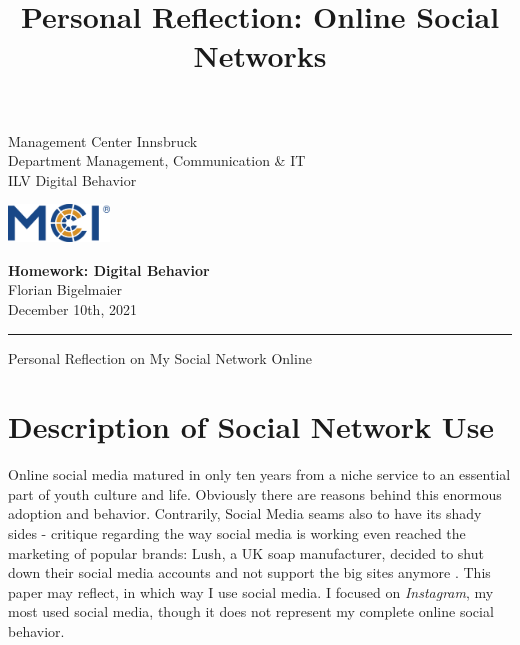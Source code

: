 \documentclass[11pt,letterpaper]{article}
\newcommand{\fontsmall}{\fontsize{7pt}{10pt}\selectfont}
\newcommand{\fontnormal}{\fontsize{11pt}{16pt}\selectfont}
\newcommand{\headline}{\fontsize{17pt}{26pt}\selectfont}
\begin{document}
   \title{Personal Reflection: Online Social Networks}



\noindent\begin{minipage}{0.5\textwidth}
\fontsmall
Management Center Innsbruck \\
Department Management, Communication \& IT  \\
ILV Digital Behavior


\end{minipage}%
\hfill%
\begin{minipage}{0.3\textwidth}\raggedleft
\includegraphics[height=1.0cm]{mci-logo.png}

\end{minipage}



\begin{center}
\textbf{Homework: Digital Behavior}\\   %
Florian Bigelmaier\\                         %
December 10th, 2021\\                         %
\end{center}
\rule{\linewidth}{0.1mm}




\headline \begin{center}
Personal Reflection on My Social Network Online
\end{center}
\fontnormal

\section*{Description of Social Network Use}
\begin{center}
 \autocite[][]{Perrin.2015}
\end{center}

Online social media matured in only ten years from a niche service to an essential part of youth culture and life. Obviously there are reasons behind this enormous adoption and behavior. Contrarily, Social Media seams also to have its shady sides - critique regarding the way social media is working even reached the marketing of popular brands: Lush, a UK soap manufacturer, decided to shut down their social media accounts and not support the big sites anymore \autocite[][]{Wood.2021}. This paper may reflect, in which way I use social media. I focused on \textit{Instagram}, my most used social media, though it does not represent my complete online social behavior.
\end{document}
